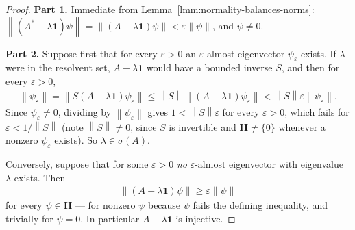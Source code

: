 \begin{proof}
    \leanok
\textbf{Part 1.} Immediate from Lemma~\ref{lmm:normality-balances-norms}: $\left\| (A^*-\overline\lambda\mathbf{1})\psi \right\| = \left\| (A-\lambda\mathbf{1})\psi \right\| < \varepsilon\left\| \psi \right\|$, and $\psi \ne 0$.

\textbf{Part 2.} Suppose first that for every $\varepsilon > 0$ an $\varepsilon$-almost eigenvector $\psi_\varepsilon$ exists. If $\lambda$ were in the resolvent set, $A - \lambda\mathbf{1}$ would have a bounded inverse $S$, and then for every $\varepsilon>0$,
\begin{align}
    \left\| \psi_\varepsilon \right\| = \left\| S(A-\lambda\mathbf{1})\psi_\varepsilon \right\| \le \left\| S \right\| \left\| (A-\lambda\mathbf{1})\psi_\varepsilon \right\| < \left\| S \right\| \varepsilon \left\| \psi_\varepsilon \right\|.
\end{align}
Since $\psi_\varepsilon \ne 0$, dividing by $\left\| \psi_\varepsilon \right\|$ gives $1 < \left\| S \right\|\varepsilon$ for every $\varepsilon>0$, which fails for $\varepsilon < 1/\left\| S \right\|$ (note $\left\| S \right\| \neq 0$, since $S$ is invertible and $\mathbf{H} \ne \{0\}$ whenever a nonzero $\psi_\varepsilon$ exists). So $\lambda \in \sigma(A)$.

Conversely, suppose that for some $\varepsilon > 0$ \textit{no} $\varepsilon$-almost eigenvector with eigenvalue $\lambda$ exists. Then
\begin{align}
    \left\| (A - \lambda\mathbf{1})\psi \right\| \ge \varepsilon \left\| \psi \right\| \tag{$\natural$}
\end{align}
for every $\psi \in \mathbf{H}$ — for nonzero $\psi$ because $\psi$ fails the defining inequality, and trivially for $\psi = 0$. In particular $A - \lambda\mathbf{1}$ is injective.


\end{proof}
